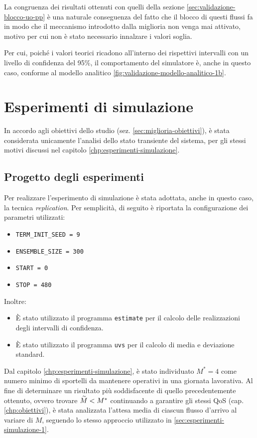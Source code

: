 La congruenza dei risultati ottenuti con quelli della sezione \ref{sec:validazione-blocco-uo-pp} è una naturale conseguenza del fatto che il blocco di questi flussi fa in modo che il meccanismo introdotto dalla miglioria non venga mai attivato, motivo per cui non è stato necessario innalzare i valori soglia.

Per cui, poiché i valori teorici ricadono all'interno dei rispettivi intervalli con un livello di confidenza del 95\%, il comportamento del simulatore è, anche in questo caso, conforme al modello analitico \ref{fig:validazione-modello-analitico-1b}.

\section{Esperimenti di simulazione}
In accordo agli obiettivi dello studio (sez. \ref{sec:miglioria-obiettivi}), è stata considerata unicamente l'analisi dello stato transiente del sistema, per gli stessi motivi discussi nel capitolo \ref{chp:esperimenti-simulazione}.

\subsection{Progetto degli esperimenti}
Per realizzare l'esperimento di simulazione è stata adottata, anche in questo caso, la tecnica \textit{replication}. Per semplicità, di seguito è riportata la configurazione dei parametri utilizzati:
\begin{itemize}
\item \texttt{TERM\_INIT\_SEED = 9}
\item \texttt{ENSEMBLE\_SIZE = 300}
\item \texttt{START = 0}
\item \texttt{STOP = 480}
\end{itemize}

Inoltre:
\begin{itemize}
\item È stato utilizzato il programma \texttt{estimate} per il calcolo delle realizzazioni degli intervalli di confidenza.
\item È stato utilizzato il programma \texttt{uvs} per il calcolo di media e deviazione standard.
\end{itemize}

Dal capitolo \ref{chp:esperimenti-simulazione}, è stato individuato $M^* = 4$ come numero minimo di sportelli da mantenere operativi in una giornata lavorativa. Al fine di determinare un risultato più soddisfacente di quello precedentemente ottenuto, ovvero trovare $\accentset{\sim}{M} < M^*$ continuando a garantire gli stessi QoS (cap. \ref{chp:obiettivi}), è stata analizzata l'attesa media di ciascun flusso d'arrivo al variare di $M$, seguendo lo stesso approccio utilizzato in \ref{sec:esperimenti-simulazione-1}.

